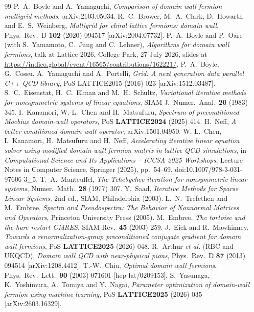 \documentclass[11pt,a4paper]{article}
\numberwithin{equation}{section}
\begin{document}
\begin{thebibliography}{99}
 P.~A.~Boyle and A.~Yamaguchi, \emph{Comparison of domain wall fermion multigrid methods}, arXiv:2103.05034.
 R.~C.~Brower, M.~A.~Clark, D.~Howarth and E.~S.~Weinberg, \emph{Multigrid for chiral lattice fermions: domain wall},
Phys.\ Rev.\ D \textbf{102} (2020) 094517 [arXiv:2004.07732].
 P.~A.~Boyle and P.~Oare (with S.~Yamamoto, C.~Jung and C.~Lehner), \emph{Algorithms for domain wall fermions}, talk at Lattice 2026, College Park, 27 July 2026, slides at \url{https://indico.global/event/16565/contributions/162221/}.
 P.~A.~Boyle, G.~Cossu, A.~Yamaguchi and A.~Portelli, \emph{Grid: A next generation data parallel C++ QCD library}, PoS LATTICE2015 (2016) 023 [arXiv:1512.03487].
 S.~C.~Eisenstat, H.~C.~Elman and M.~H.~Schultz, \emph{Variational iterative methods for nonsymmetric systems of linear equations},
SIAM J.\ Numer.\ Anal.\ \textbf{20} (1983) 345.
 I.~Kanamori, W.-L.~Chen and H.~Matsufuru, \emph{Spectrum of preconditioned Moebius domain-wall operators}, PoS \textbf{LATTICE2024} (2025) 414.
 H.~Neff, \emph{A better conditioned domain wall operator}, arXiv:1501.04950.
 W.-L.~Chen, I.~Kanamori, H.~Matsufuru and H.~Neff, \emph{Accelerating iterative linear equation solver using modified domain-wall fermion matrix in lattice QCD simulations}, in \emph{Computational Science and Its Applications -- ICCSA 2025 Workshops}, Lecture Notes in Computer Science, Springer (2025), pp.~54--69, doi:10.1007/978-3-031-97606-3\_5.
 T.~A.~Manteuffel, \emph{The Tchebychev iteration for nonsymmetric linear systems},
Numer.\ Math.\ \textbf{28} (1977) 307.
 Y.~Saad, \emph{Iterative Methods for Sparse Linear Systems}, 2nd ed., SIAM, Philadelphia (2003).
 L.~N.~Trefethen and M.~Embree, \emph{Spectra and Pseudospectra: The Behavior of Nonnormal Matrices and Operators}, Princeton University Press (2005).
 M.~Embree, \emph{The tortoise and the hare restart GMRES},
SIAM Rev.\ \textbf{45} (2003) 259.
 J.~Eick and R.~Mawhinney, \emph{Towards a renormalization-group preconditioned conjugate gradient for domain wall fermions}, PoS \textbf{LATTICE2025} (2026) 048.
 R.~Arthur \emph{et al.} (RBC and UKQCD), \emph{Domain wall QCD with near-physical pions}, Phys.\ Rev.\ D \textbf{87} (2013) 094514 [arXiv:1208.4412].
 T.-W.~Chiu, \emph{Optimal domain wall fermions}, Phys.\ Rev.\ Lett.\ \textbf{90} (2003) 071601 [hep-lat/0209153].
 S.~Yasunaga, K.~Yoshimura, A.~Tomiya and Y.~Nagai, \emph{Parameter optimization of domain-wall fermion using machine learning}, PoS \textbf{LATTICE2025} (2026) 035 [arXiv:2603.16329].

\end{thebibliography}
\end{document}
